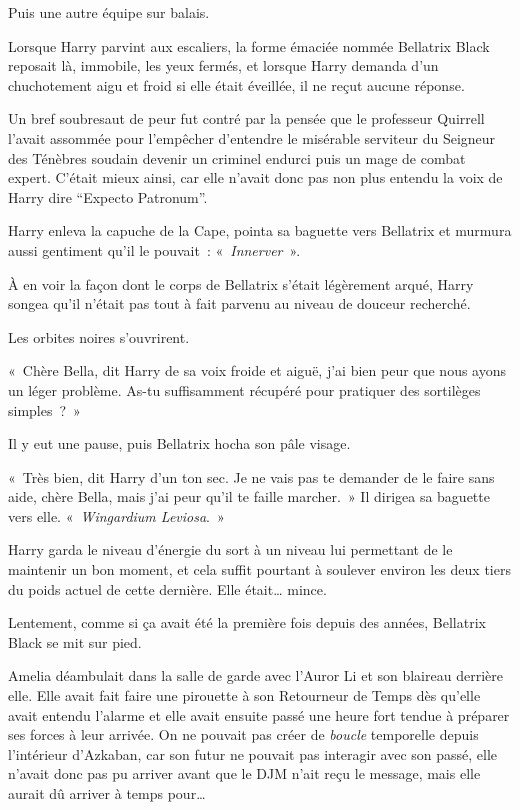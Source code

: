 Puis une autre équipe sur balais.

\later

Lorsque Harry parvint aux escaliers, la forme émaciée nommée Bellatrix Black reposait là, immobile, les yeux fermés, et lorsque Harry demanda d'un chuchotement aigu et froid si elle était éveillée, il ne reçut aucune réponse.

Un bref soubresaut de peur fut contré par la pensée que le professeur Quirrell l'avait assommée pour l'empêcher d'entendre le misérable serviteur du Seigneur des Ténèbres soudain devenir un criminel endurci puis un mage de combat expert. C'était mieux ainsi, car elle n'avait donc pas non plus entendu la voix de Harry dire “Expecto Patronum”.

Harry enleva la capuche de la Cape, pointa sa baguette vers Bellatrix et murmura aussi gentiment qu'il le pouvait~: «~\emph{Innerver}~».

À en voir la façon dont le corps de Bellatrix s'était légèrement arqué, Harry songea qu'il n'était pas tout à fait parvenu au niveau de douceur recherché.

Les orbites noires s'ouvrirent.

«~Chère Bella, dit Harry de sa voix froide et aiguë, j'ai bien peur que nous ayons un léger problème. As-tu suffisamment récupéré pour pratiquer des sortilèges simples~?~»

Il y eut une pause, puis Bellatrix hocha son pâle visage.

«~Très bien, dit Harry d'un ton sec. Je ne vais pas te demander de le faire sans aide, chère Bella, mais j'ai peur qu'il te faille marcher.~» Il dirigea sa baguette vers elle. «~\emph{Wingardium Leviosa}.~»

Harry garda le niveau d'énergie du sort à un niveau lui permettant de le maintenir un bon moment, et cela suffit pourtant à soulever environ les deux tiers du poids actuel de cette dernière. Elle était… mince.

Lentement, comme si ça avait été la première fois depuis des années, Bellatrix Black se mit sur pied.

\later

Amelia déambulait dans la salle de garde avec l'Auror Li et son blaireau derrière elle. Elle avait fait faire une pirouette à son Retourneur de Temps dès qu'elle avait entendu l'alarme et elle avait ensuite passé une heure fort tendue à préparer ses forces à leur arrivée. On ne pouvait pas créer de \emph{boucle} temporelle depuis l'intérieur d'Azkaban, car son futur ne pouvait pas interagir avec son passé, elle n'avait donc pas pu arriver avant que le DJM n'ait reçu le message, mais elle aurait dû arriver à temps pour…

